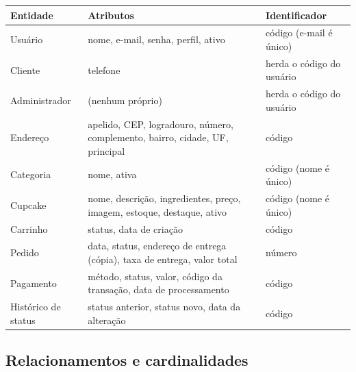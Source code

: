 \documentclass[12pt]{article}
\begin{document}
\begin{longtable}{|p{3.0cm}|p{6.4cm}|p{4.2cm}|}
\hline
\rowcolor{gray!30} \textbf{Entidade} & \textbf{Atributos} & \textbf{Identificador} \\ \hline
\endhead
Usuário & nome, e-mail, senha, perfil, ativo & código (e-mail é único) \\ \hline
Cliente & telefone & herda o código do usuário \\ \hline
Administrador & (nenhum próprio) & herda o código do usuário \\ \hline
Endereço & apelido, CEP, logradouro, número, complemento, bairro, cidade, UF, principal & código \\ \hline
Categoria & nome, ativa & código (nome é único) \\ \hline
Cupcake & nome, descrição, ingredientes, preço, imagem, estoque, destaque, ativo & código (nome é único) \\ \hline
Carrinho & status, data de criação & código \\ \hline
Pedido & data, status, endereço de entrega (cópia), taxa de entrega, valor total & número \\ \hline
Pagamento & método, status, valor, código da transação, data de processamento & código \\ \hline
Histórico de status & status anterior, status novo, data da alteração & código \\ \hline
\end{longtable}

\subsection{Relacionamentos e cardinalidades}
\end{document}
